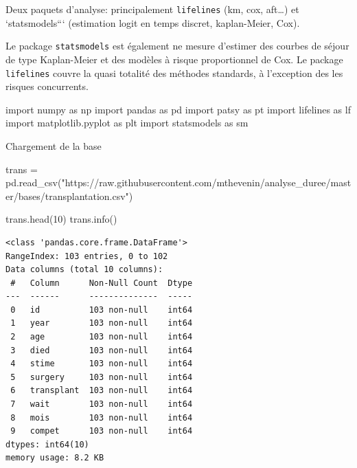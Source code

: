 \documentclass[
  12pt,
  letterpaper,
  DIV=11,
  numbers=noendperiod,
  onepage,
  openany]{scrreprt}
\newenvironment{Shaded}{\begin{snugshade}}{\end{snugshade}}
\newcommand{\DecValTok}[1]{\textcolor[rgb]{0.86,0.86,0.80}{#1}}
\newcommand{\ImportTok}[1]{\textcolor[rgb]{0.80,0.80,0.80}{#1}}
\newcommand{\NormalTok}[1]{\textcolor[rgb]{0.80,0.80,0.80}{#1}}
\newcommand{\OperatorTok}[1]{\textcolor[rgb]{0.94,0.94,0.82}{#1}}
\newcommand{\StringTok}[1]{\textcolor[rgb]{0.80,0.58,0.58}{#1}}
\begin{document}
Deux paquets d'analyse: principalement \texttt{lifelines} (km, cox,
aft\ldots) et `statsmodels``` (estimation logit en temps discret,
kaplan-Meier, Cox).

Le package \texttt{statsmodels} est également ne mesure d'estimer des
courbes de séjour de type Kaplan-Meier et des modèles à risque
proportionnel de Cox. Le package \texttt{lifelines} couvre la quasi
totalité des méthodes standards, à l'exception des les risques
concurrents.

\begin{Shaded}
\begin{Highlighting}[]
\ImportTok{import}\NormalTok{ numpy  }\ImportTok{as}\NormalTok{ np}
\ImportTok{import}\NormalTok{ pandas }\ImportTok{as}\NormalTok{ pd}
\ImportTok{import}\NormalTok{ patsy  }\ImportTok{as}\NormalTok{ pt}
\ImportTok{import}\NormalTok{ lifelines }\ImportTok{as}\NormalTok{ lf}
\ImportTok{import}\NormalTok{ matplotlib.pyplot }\ImportTok{as}\NormalTok{ plt}
\ImportTok{import}\NormalTok{ statsmodels }\ImportTok{as}\NormalTok{ sm}
\end{Highlighting}
\end{Shaded}

Chargement de la base

\begin{Shaded}
\begin{Highlighting}[]
\NormalTok{trans }\OperatorTok{=}\NormalTok{ pd.read\_csv(}\StringTok{"https://raw.githubusercontent.com/mthevenin/analyse\_duree/master/bases/transplantation.csv"}\NormalTok{)}

\NormalTok{trans.head(}\DecValTok{10}\NormalTok{)}
\NormalTok{trans.info()}
\end{Highlighting}
\end{Shaded}

\begin{verbatim}
<class 'pandas.core.frame.DataFrame'>
RangeIndex: 103 entries, 0 to 102
Data columns (total 10 columns):
 #   Column      Non-Null Count  Dtype
---  ------      --------------  -----
 0   id          103 non-null    int64
 1   year        103 non-null    int64
 2   age         103 non-null    int64
 3   died        103 non-null    int64
 4   stime       103 non-null    int64
 5   surgery     103 non-null    int64
 6   transplant  103 non-null    int64
 7   wait        103 non-null    int64
 8   mois        103 non-null    int64
 9   compet      103 non-null    int64
dtypes: int64(10)
memory usage: 8.2 KB
\end{verbatim}
\end{document}
